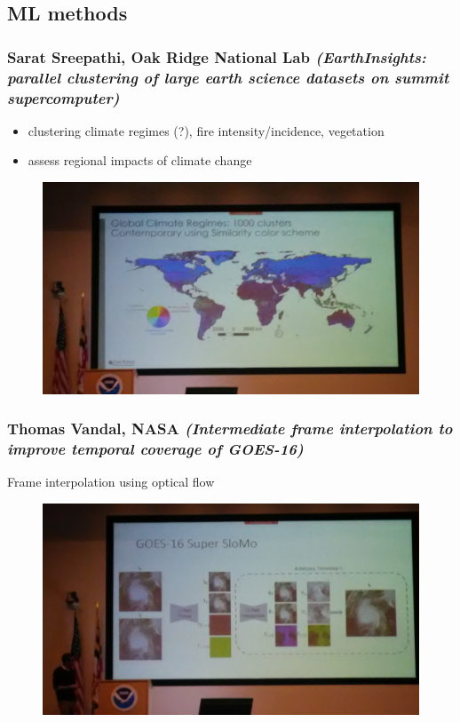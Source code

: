 \documentclass{beamer}
\begin{document}
\subsection{ML methods}
\begin{frame}
\frametitle{Sarat Sreepathi, Oak Ridge National Lab
 \textit{(EarthInsights: parallel clustering of large earth science datasets on summit supercomputer)}}
 \begin{itemize}
\item clustering climate regimes (?), fire intensity/incidence, vegetation
\item assess regional impacts of climate change
\end{itemize}
\begin{figure}
	\includegraphics[width=.8\linewidth]{figs/P_20190424_104512.jpg}
\end{figure}
\end{frame}

\begin{frame}
\frametitle{Thomas Vandal, NASA \textit{(Intermediate frame interpolation to improve temporal coverage of GOES-16)}}
Frame interpolation using optical flow
\begin{figure}
	\includegraphics[width=.9\linewidth]{figs/P_20190424_111508.jpg}
\end{figure}
\end{frame}
\end{document}
